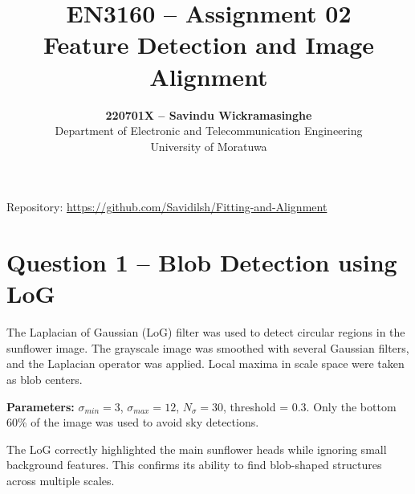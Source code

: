 \documentclass[11pt,a4paper]{article}
\title{\textbf{EN3160 – Assignment 02}\\Feature Detection and Image Alignment}
\author{\textbf{220701X – Savindu Wickramasinghe}\\Department of Electronic and Telecommunication Engineering\\University of Moratuwa}
\date{}
\begin{document}
\maketitle
\begin{center}
\vspace{-6mm}
{\small Repository: \href{https://github.com/Savidilsh/Fitting-and-Alignment}{\url{https://github.com/Savidilsh/Fitting-and-Alignment}}}
\end{center}

\section*{Question 1 – Blob Detection using LoG}
The Laplacian of Gaussian (LoG) filter was used to detect circular regions in the sunflower image.  
The grayscale image was smoothed with several Gaussian filters, and the Laplacian operator was applied.  
Local maxima in scale space were taken as blob centers.

\textbf{Parameters:} $\sigma_{min}=3$, $\sigma_{max}=12$, $N_\sigma=30$, threshold = 0.3.  
Only the bottom 60\% of the image was used to avoid sky detections.

The LoG correctly highlighted the main sunflower heads while ignoring small background features.  
This confirms its ability to find blob-shaped structures across multiple scales.
\end{document}
